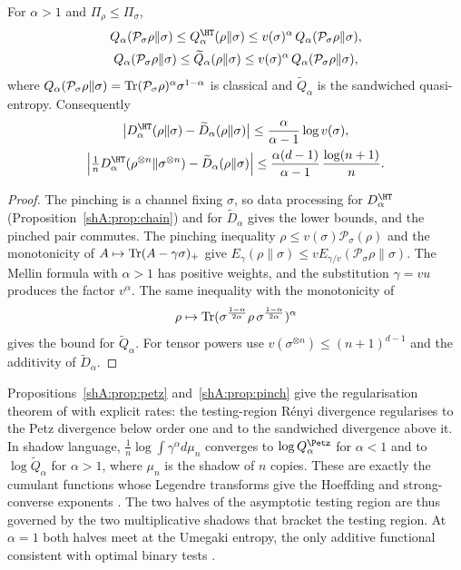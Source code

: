 \begin{proposition}\label{shA:prop:pinch}
For $\alpha>1$ and $\Pi_\rho\le\Pi_\sigma$,
\begin{gather*}
Q_\alpha(\mathcal P_\sigma\rho\|\sigma)\le Q^\HT_\alpha(\rho\|\sigma)\le v(\sigma)^\alpha\,Q_\alpha(\mathcal P_\sigma\rho\|\sigma),\\
 Q_\alpha(\mathcal P_\sigma\rho\|\sigma)\le \widetilde Q_\alpha(\rho\|\sigma)\le v(\sigma)^\alpha\,Q_\alpha(\mathcal P_\sigma\rho\|\sigma),
\end{gather*}
where $Q_\alpha(\mathcal P_\sigma\rho\|\sigma)=\operatorname{Tr}(\mathcal P_\sigma\rho)^\alpha\sigma^{1-\alpha}$ is classical and $\widetilde Q_\alpha$ is the sandwiched quasi-entropy. Consequently
\begin{gather*}
\big|D^\HT_\alpha(\rho\|\sigma)-\widetilde D_\alpha(\rho\|\sigma)\big|\le\frac{\alpha}{\alpha-1}\log v(\sigma),\\
 \Big|\tfrac1nD^\HT_\alpha(\rho^{\otimes n}\|\sigma^{\otimes n})-\widetilde D_\alpha(\rho\|\sigma)\Big|\le\frac{\alpha(d-1)}{\alpha-1}\,\frac{\log(n+1)}{n}.
\end{gather*}
\end{proposition}

\begin{proof}
The pinching is a channel fixing $\sigma$, so data processing for $D^\HT_\alpha$ (Proposition~\ref{shA:prop:chain}) and for $\widetilde D_\alpha$ gives the lower bounds, and the pinched pair commutes. The pinching inequality $\rho\le v(\sigma)\mathcal P_\sigma(\rho)$ \cite{Hayashi2002} and the monotonicity of $A\mapsto\operatorname{Tr}(A-\gamma\sigma)_+$ give $E_\gamma(\rho\|\sigma)\le vE_{\gamma/v}(\mathcal P_\sigma\rho\|\sigma)$. The Mellin formula with $\alpha>1$ has positive weights, and the substitution $\gamma=vu$ produces the factor $v^\alpha$. The same inequality with the monotonicity of
\[
\rho\mapsto\operatorname{Tr}(\sigma^{\frac{1-\alpha}{2\alpha}}\rho\,\sigma^{\frac{1-\alpha}{2\alpha}})^\alpha
\]
gives the bound for $\widetilde Q_\alpha$. For tensor powers use $v(\sigma^{\otimes n})\le(n+1)^{d-1}$ and the additivity of $\widetilde D_\alpha$.
\end{proof}

Propositions~\ref{shA:prop:petz} and~\ref{shA:prop:pinch} give the regularisation theorem of \cite{HircheTomamichel2024} with explicit rates: the testing-region R\'enyi divergence regularises to the Petz divergence below order one and to the sandwiched divergence above it. In shadow language, $\frac1n\log\int\gamma^\alpha d\mu_n$ converges to $\log Q^\Petz_\alpha$ for $\alpha<1$ and to $\log\widetilde Q_\alpha$ for $\alpha>1$, where $\mu_n$ is the shadow of $n$ copies. These are exactly the cumulant functions whose Legendre transforms give the Hoeffding and strong-converse exponents \cite{Hayashi2007,Nagaoka2006,MosonyiOgawa2015}. The two halves of the asymptotic testing region are thus governed by the two multiplicative shadows that bracket the testing region. At $\alpha=1$ both halves meet at the Umegaki entropy, the only additive functional consistent with optimal binary tests \cite{Gour2026}.


